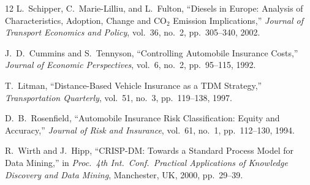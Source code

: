 \documentclass[conference]{IEEEtran}
\begin{document}
\begin{thebibliography}{12}
L.~Schipper, C.~Marie-Lilliu, and L.~Fulton,
``Diesels in Europe: Analysis of Characteristics, Adoption, Change
and CO$_2$ Emission Implications,''
\textit{Journal of Transport Economics and Policy}, vol.~36, no.~2,
pp.~305--340, 2002.

J.~D.~Cummins and S.~Tennyson,
``Controlling Automobile Insurance Costs,''
\textit{Journal of Economic Perspectives}, vol.~6, no.~2,
pp.~95--115, 1992.

T.~Litman,
``Distance-Based Vehicle Insurance as a TDM Strategy,''
\textit{Transportation Quarterly}, vol.~51, no.~3, pp.~119--138, 1997.

D.~B.~Rosenfield,
``Automobile Insurance Risk Classification: Equity and Accuracy,''
\textit{Journal of Risk and Insurance}, vol.~61, no.~1,
pp.~112--130, 1994.

R.~Wirth and J.~Hipp,
``CRISP-DM: Towards a Standard Process Model for Data Mining,''
in \textit{Proc.\ 4th Int.\ Conf.\ Practical Applications of
Knowledge Discovery and Data Mining}, Manchester, UK, 2000,
pp.~29--39.

\end{thebibliography}
\end{document}

